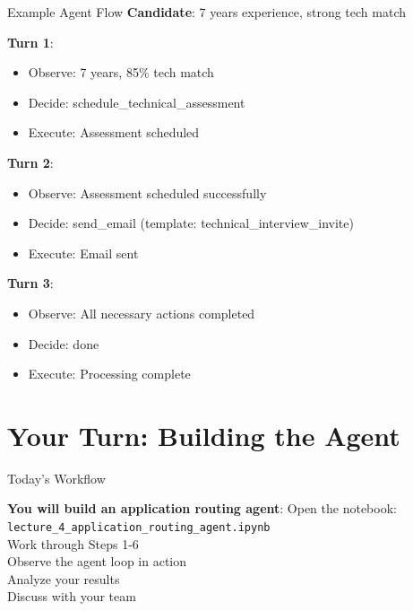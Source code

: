 \documentclass[aspectratio=169]{beamer}
\begin{document}
\begin{frame}{Example Agent Flow}
\textbf{Candidate}: 7 years experience, strong tech match
\vspace{0.3cm}

\textbf{Turn 1}:
\begin{itemize}
    \item Observe: 7 years, 85\% tech match
    \item Decide: schedule\_technical\_assessment
    \item Execute: Assessment scheduled
\end{itemize}

\textbf{Turn 2}:
\begin{itemize}
    \item Observe: Assessment scheduled successfully
    \item Decide: send\_email (template: technical\_interview\_invite)
    \item Execute: Email sent
\end{itemize}

\textbf{Turn 3}:
\begin{itemize}
    \item Observe: All necessary actions completed
    \item Decide: done
    \item Execute: Processing complete
\end{itemize}
\end{frame}

\section{Your Turn: Building the Agent}

\begin{frame}{Today's Workflow}


\begin{center}
\textbf{You will build an application routing agent}:
\vspace{0.3cm}
\Large
Open the notebook: \\[0.3cm]
\texttt{lecture\_4\_application\_routing\_agent.ipynb}
\\[1cm]

Work through Steps 1-6 \\[0.3cm]
Observe the agent loop in action \\[0.3cm]
Analyze your results \\[0.3cm]
Discuss with your team
\end{center}
\end{frame}
\end{document}
